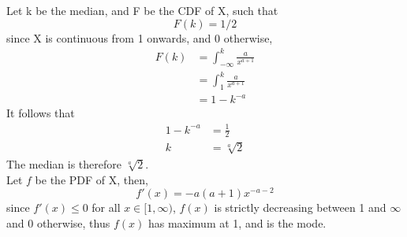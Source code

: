 Let k be the median, and F be the CDF of X, such that
\[F(k) = 1/2\]
since X is continuous from 1 onwards, and 0 otherwise,
\begin{align*}
F(k) &= \int_{-\infty}^{k}{\frac{a}{x^{a+1}}} \\
&= \int_{1}^{k}{\frac{a}{x^{a+1}}} \\
&= 1 - k^{-a}
\end{align*}
It follows that
\begin{align*}
1-k^{-a} &= \frac{1}{2} \\
k &= \sqrt[a]{2}
\end{align*}
The median is therefore \(\sqrt[a]{2}\). \\ 

Let $f$ be the PDF of X, then,
\[f'(x) = -a(a+1)x^{-a-2}\]
since $f'(x) \le 0$ for all $x \in [1,\infty)$, $f(x)$ is strictly decreasing between 1 and \(\infty\) and 0 otherwise, thus $f(x)$ has maximum at 1, and is the mode.
